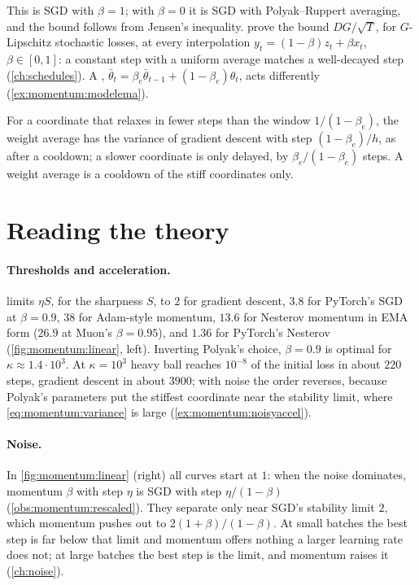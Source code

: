 \begin{refsection}
This is  SGD with $\beta=1$; with $\beta=0$ it is SGD with Polyak--Ruppert averaging, and the bound follows from Jensen's inequality. \Textcite{DefazioEtAl2024} prove the bound $DG/\sqrt T$, for $G$-Lipschitz stochastic losses, at every interpolation $y_t=(1-\beta)z_t+\beta x_t$, $\beta\in[0,1]$: a constant step with a uniform average matches a well-decayed step (\cref{ch:schedules}). A , $\bar\theta_t=\beta_e\bar\theta_{t-1}+(1-\beta_e)\theta_t$, acts differently (\cref{ex:momentum:modelema}).

\begin{heuristic}
For a coordinate that relaxes in fewer steps than the window $1/(1-\beta_e)$, the weight average has the variance of gradient descent with step $(1-\beta_e)/h$, as after a cooldown; a slower coordinate is only delayed, by $\beta_e/(1-\beta_e)$ steps. A weight average is a cooldown of the stiff coordinates only.
\end{heuristic}

\section{Reading the theory}\label{sec:momentum:reading}

\paragraph{Thresholds and acceleration.}  limits $\eta S$, for the sharpness $S$, to $2$ for gradient descent, $3.8$ for PyTorch's SGD at $\beta=0.9$, $38$ for Adam-style momentum, $13.6$ for Nesterov momentum in EMA form ($26.9$ at Muon's $\beta=0.95$), and $1.36$ for PyTorch's Nesterov (\cref{fig:momentum:linear}, left). Inverting Polyak's choice, $\beta=0.9$ is optimal for $\kappa\approx1.4\cdot10^3$. At $\kappa=10^3$ heavy ball reaches $10^{-8}$ of the initial loss in about $220$ steps, gradient descent in about $3900$; with noise the order reverses, because Polyak's parameters put the stiffest coordinate near the stability limit, where \eqref{eq:momentum:variance} is large (\cref{ex:momentum:noisyaccel}).

\paragraph{Noise.} In \cref{fig:momentum:linear} (right) all curves start at $1$: when the noise dominates, momentum $\beta$ with step $\eta$ is SGD with step $\eta/(1-\beta)$ (\cref{obs:momentum:rescaled}). They separate only near SGD's stability limit $2$, which momentum pushes out to $2(1+\beta)/(1-\beta)$. At small batches the best step is far below that limit and momentum offers nothing a larger learning rate does not; at large batches the best step is the limit, and momentum raises it (\cref{ch:noise}).


\end{refsection}
